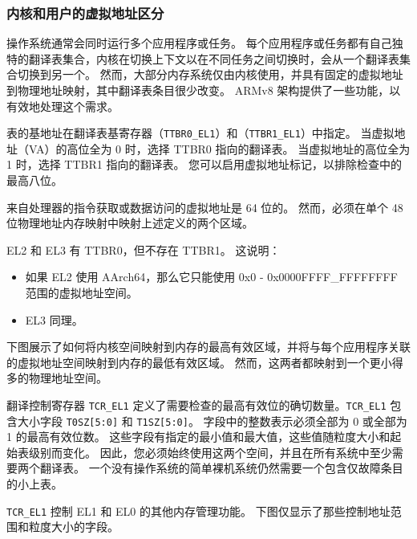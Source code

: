 \subsubsection{内核和用户的虚拟地址区分}

操作系统通常会同时运行多个应用程序或任务。
每个应用程序或任务都有自己独特的翻译表集合，内核在切换上下文以在不同任务之间切换时，会从一个翻译表集合切换到另一个。
然而，大部分内存系统仅由内核使用，并具有固定的虚拟地址到物理地址映射，其中翻译表条目很少改变。
ARMv8 架构提供了一些功能，以有效地处理这个需求。

表的基地址在翻译表基寄存器（\lstinline!TTBR0_EL1!）和（\lstinline!TTBR1_EL1!）中指定。
当虚拟地址（VA）的高位全为 0 时，选择 TTBR0 指向的翻译表。
当虚拟地址的高位全为 1 时，选择 TTBR1 指向的翻译表。
您可以启用虚拟地址标记，以排除检查中的最高八位。

来自处理器的指令获取或数据访问的虚拟地址是 64 位的。
然而，必须在单个 48 位物理地址内存映射中映射上述定义的两个区域。

EL2 和 EL3 有 TTBR0，但不存在 TTBR1。
这说明：

\begin{itemize}
  \item 如果 EL2 使用 AArch64，那么它只能使用 0x0 - 0x0000FFFF\_FFFFFFFF 范围的虚拟地址空间。
  \item EL3 同理。
\end{itemize}

下图展示了如何将内核空间映射到内存的最高有效区域，并将与每个应用程序关联的虚拟地址空间映射到内存的最低有效区域。
然而，这两者都映射到一个更小得多的物理地址空间。


翻译控制寄存器 \lstinline!TCR_EL1! 定义了需要检查的最高有效位的确切数量。\lstinline!TCR_EL1! 包含大小字段 \lstinline!T0SZ[5:0]! 和 \lstinline!T1SZ[5:0]!。
字段中的整数表示必须全部为 0 或全部为 1 的最高有效位数。
这些字段有指定的最小值和最大值，这些值随粒度大小和起始表级别而变化。
因此，您必须始终使用这两个空间，并且在所有系统中至少需要两个翻译表。
一个没有操作系统的简单裸机系统仍然需要一个包含仅故障条目的小上表。


\lstinline!TCR_EL1! 控制 EL1 和 EL0 的其他内存管理功能。
下图仅显示了那些控制地址范围和粒度大小的字段。


